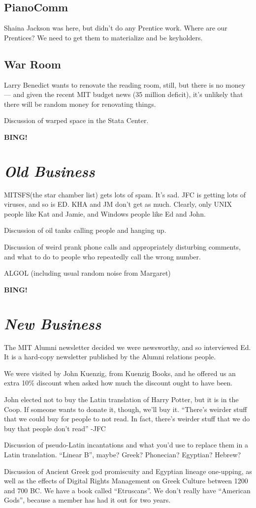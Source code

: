 \documentclass[10pt]{article}
\newcommand{\bing}{{\bf BING!} }
\newcommand{\goto}[1]{\bing \vskip 12pt \section*{{\em{#1}}}}
\begin{document}
\subsection*{PianoComm}
Shaina Jackson was here, but didn't do any Prentice work.
Where are our Prentices? We need to get them to materialize and be keyholders.

\subsection*{War Room}
Larry Benedict wants to renovate the reading room, still, but there is
no money --- and given the recent MIT budget news (35 million
deficit), it's unlikely that there will be random money for renovating things.

Discussion of warped space in the Stata Center.

\goto{Old Business}
MITSFS(the star chamber list) gets lots of spam. It's sad.
JFC is getting lots of viruses, and so is ED.  KHA and JM don't get as
much. Clearly, only UNIX people like Kat and Jamie, and Windows people like
Ed and John.

Discussion of oil tanks calling people and hanging up.

Discussion of weird prank phone calls and appropriately disturbing
comments, and what to do to people who repeatedly call the wrong number.

ALGOL (including usual random noise from Margaret)

\goto{New Business}
The MIT Alumni newsletter decided we were newsworthy, and so
interviewed Ed.  It is a hard-copy newsletter published by the Alumni
relations people.

We were visited by John Kuenzig, from Kuenzig Books, and he offered us
an extra 10\% discount when asked how much the discount ought to have
been.

John elected not to buy the Latin translation of Harry Potter, but it
is in the Coop.  If someone wants to donate it, though, we'll buy it.
``There's weirder stuff that we could buy for people to not read. In
fact, there's weirder stuff that we do buy that people don't
read'' -JFC

Discussion of pseudo-Latin incantations and what you'd use to replace
them in a Latin translation.  ``Linear B'', maybe? Greek? Phonecian? Egyptian? Hebrew?

Discussion of Ancient Greek god promiscuity and Egyptian lineage
one-upping, as well as the effects of Digital Rights Management on
Greek Culture between 1200 and 700 BC.  We have a book called
``Etruscans''. We don't really have ``American Gods'', because a
member has had it out for two years.
\end{document}
